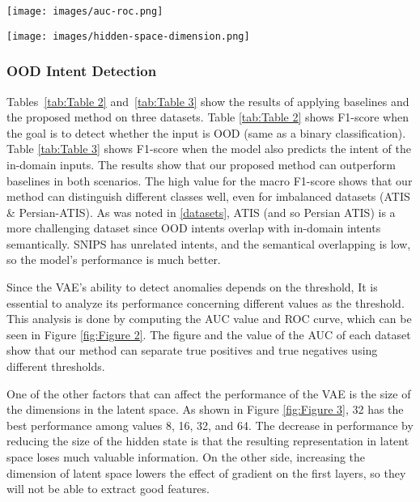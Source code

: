 \documentclass{article}
\begin{document}
  \begin{figure*}[ht!]
	\centering
	\texttt{[image: images/auc-roc.png]}
	\caption{ROC curve and AUC value for all dataset; Results show that proposed method can separate true negatives and positives
			well on different thresholds.}
	\label{fig:Figure 2}
  \end{figure*}
  \begin{figure*}[ht!]
	\centering
	\texttt{[image: images/hidden-space-dimension.png]}
	\caption{The effect of changes in the dimension of the representations in hidden space. x-axis is dimension and y-axis is the
			macro F1-score. Also, (a) is showing the effect in multi-class classification and (b) is showing the effect in binary classification.}
	\label{fig:Figure 3}
  \end{figure*}

\subsubsection{OOD Intent Detection}

Tables~\ref{tab:Table 2} and~\ref{tab:Table 3} show the results of applying baselines and the proposed method on three datasets. 
Table \ref{tab:Table 2} shows F1-score when the goal is to detect whether the input is OOD (same as a binary classification). 
Table \ref{tab:Table 3} shows F1-score when the model also predicts the intent of the in-domain inputs. 
The results show that our proposed method can outperform baselines in both scenarios.
The high value for the macro F1-score shows that our method can distinguish different classes well, even for imbalanced datasets (ATIS \& Persian-ATIS). 
As was noted in \ref{datasets}, ATIS (and so Persian ATIS) is a more challenging dataset since OOD intents overlap with in-domain intents semantically.
SNIPS has unrelated intents, and the semantical overlapping is low, so the model's performance is much better.

Since the VAE's ability to detect anomalies depends on the threshold, 
It is essential to analyze its performance concerning different values as the threshold. 
This analysis is done by computing the AUC value and ROC curve, which can be seen in Figure \ref{fig:Figure 2}. 
The figure and the value of the AUC of each dataset show that our method can separate true positives and true negatives using different thresholds.

One of the other factors that can affect the performance of the VAE is the size of the dimensions in the latent space. 
As shown in Figure \ref{fig:Figure 3}, 32 has the best performance among values 8, 16, 32, and 64.
The decrease in performance by reducing the size of the hidden state is that the resulting representation in latent space loses much valuable information. 
On the other side, increasing the dimension of latent space lowers the effect of gradient on the first layers, so they will not be able to extract good features.
\end{document}
